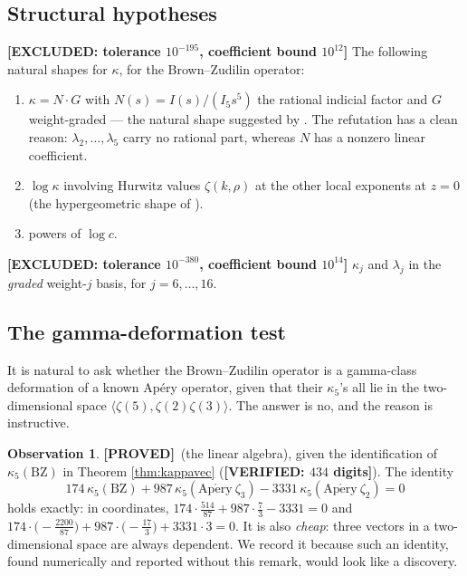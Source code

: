 \documentclass[11pt,reqno]{amsart}
\theoremstyle{plain}
\theoremstyle{definition}
\newtheorem{observation}[theorem]{Observation}
\theoremstyle{remark}
\newcommand{\PROVED}{{\normalfont\sffamily\bfseries[PROVED]}}
\newcommand{\VER}[1]{{\normalfont\sffamily\bfseries[VERIFIED: #1]}}
\newcommand{\EXCL}[1]{{\normalfont\sffamily\bfseries[EXCLUDED: #1]}}
\begin{document}
\subsection{Structural hypotheses}
\EXCL{tolerance $10^{-195}$, coefficient bound $10^{12}$} The following natural shapes for
$\kappa$, for the Brown--Zudilin operator:
\begin{enumerate}[label=(\alph*),leftmargin=2.2em]
\item $\kappa=N\cdot G$ with $N(s)=I(s)/(I_5s^5)$ the rational indicial factor and $G$ weight-graded
--- the natural shape suggested by \cite[Thm.~30]{BV}. The refutation has a clean reason:
$\lambda_2,\dots,\lambda_5$ carry no rational part, whereas $N$ has a nonzero linear coefficient.
\item $\log\kappa$ involving Hurwitz values $\zeta(k,\rho)$ at the other local exponents at
$z=0$ (the hypergeometric shape of \cite[Prop.~26]{BV}).
\item powers of $\log c$.
\end{enumerate}
\EXCL{tolerance $10^{-380}$, coefficient bound $10^{14}$} $\kappa_j$ and $\lambda_j$ in the
\emph{graded} weight-$j$ basis, for $j=6,\dots,16$.

\subsection{The gamma-deformation test}\label{sec:gammadef}
It is natural to ask whether the Brown--Zudilin operator is a gamma-class deformation of a known
Ap\'ery operator, given that their $\kappa_5$'s all lie in the two-dimensional space
$\langle\zeta(5),\zeta(2)\zeta(3)\rangle$. The answer is no, and the reason is instructive.

\begin{observation}\label{obs:cheapplane}
\PROVED\ (the linear algebra), given the identification of $\kappa_5(\mathrm{BZ})$ in
Theorem \ref{thm:kappavec} (\VER{$434$ digits}).
The identity
\[
  174\,\kappa_5(\mathrm{BZ})+987\,\kappa_5(\mathrm{Ap\acute ery}\ \zeta_3)
  -3331\,\kappa_5(\mathrm{Ap\acute ery}\ \zeta_2)=0
\]
holds exactly: in coordinates, $174\cdot\tfrac{514}{87}+987\cdot\tfrac73-3331=0$ and
$174\cdot\bigl(-\tfrac{2200}{87}\bigr)+987\cdot\bigl(-\tfrac{17}{3}\bigr)+3331\cdot 3=0$. It is
also \emph{cheap}: three vectors in a two-dimensional space are always dependent. We record it
because such an identity, found numerically and reported without this remark, would look like a
discovery.
\end{observation}
\end{document}
